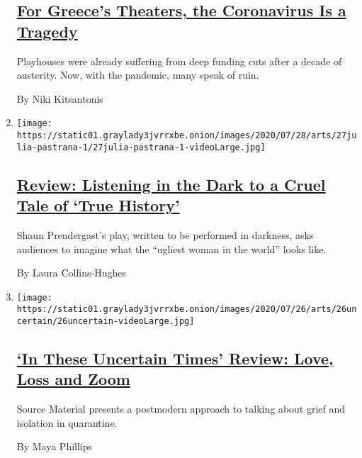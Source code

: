 \begin{enumerate}
  \hypertarget{for-greeces-theaters-the-coronavirus-is-a-tragedy}{%
  \subsection{\texorpdfstring{\href{/2020/07/30/theater/greece-theater-austerity-coronavirus.html}{For
  Greece's Theaters, the Coronavirus Is a
  Tragedy}}{For Greece's Theaters, the Coronavirus Is a Tragedy}}\label{for-greeces-theaters-the-coronavirus-is-a-tragedy}}

  Playhouses were already suffering from deep funding cuts after a
  decade of austerity. Now, with the pandemic, many speak of ruin.

  By Niki Kitsantonis
\item
  \texttt{[image: https://static01.graylady3jvrrxbe.onion/images/2020/07/28/arts/27julia-pastrana-1/27julia-pastrana-1-videoLarge.jpg]}

  \hypertarget{review-listening-in-the-dark-to-a-cruel-tale-of-true-history}{%
  \subsection{\texorpdfstring{\href{/2020/07/27/theater/true-history-julia-pastrana-review.html}{Review:
  Listening in the Dark to a Cruel Tale of `True
  History'}}{Review: Listening in the Dark to a Cruel Tale of `True History'}}\label{review-listening-in-the-dark-to-a-cruel-tale-of-true-history}}

  Shaun Prendergast's play, written to be performed in darkness, asks
  audiences to imagine what the ``ugliest woman in the world'' looks
  like.

  By Laura Collins-Hughes
\item
  \texttt{[image: https://static01.graylady3jvrrxbe.onion/images/2020/07/26/arts/26uncertain/26uncertain-videoLarge.jpg]}

  \hypertarget{in-these-uncertain-times-review-love-loss-and-zoom}{%
  \subsection{\texorpdfstring{\href{/2020/07/26/theater/in-these-uncertain-times-review.html}{`In
  These Uncertain Times' Review: Love, Loss and
  Zoom}}{`In These Uncertain Times' Review: Love, Loss and Zoom}}\label{in-these-uncertain-times-review-love-loss-and-zoom}}

  Source Material presents a postmodern approach to talking about grief
  and isolation in quarantine.

  By Maya Phillips
\end{enumerate}

